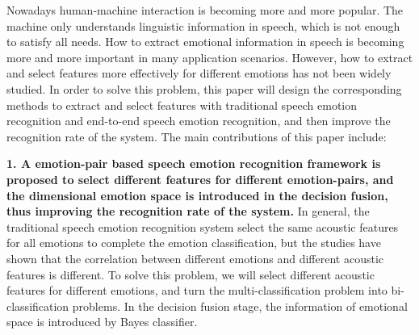 
\begin{eabstract}
  Nowadays human-machine interaction is becoming more and more popular. The machine only understands linguistic information in speech, which is not enough to satisfy all needs. How to extract emotional information in speech is becoming more and more important in many application scenarios. However, how to extract and select features more effectively for different emotions has not been widely studied. In order to solve this problem, this paper will design the corresponding methods to extract and select features with traditional speech emotion recognition and end-to-end speech emotion recognition, and then improve the recognition rate of the system. The main contributions of this paper include:


\textbf{1. A emotion-pair based speech emotion recognition framework is proposed to select different features for different emotion-pairs, and the dimensional emotion space is introduced in the decision fusion, thus improving the recognition rate of the system.}  In general, the traditional speech emotion recognition system select the same acoustic features for all emotions to complete the emotion classification, but the studies have shown that the correlation between different emotions and different acoustic features is different. To solve this problem, we will select different acoustic features for different emotions, and turn the multi-classification problem into bi-classification problems. In the decision fusion stage, the information of emotional space is introduced by Bayes classifier. 


\end{eabstract}
